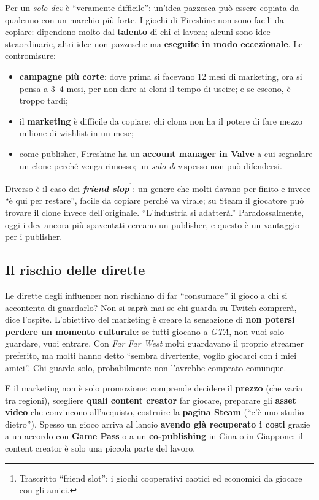 Per un \emph{solo dev} è ``veramente difficile'': un'idea pazzesca può essere
copiata da qualcuno con un marchio più forte. I giochi di Fireshine non sono facili
da copiare: dipendono molto dal \textbf{talento} di chi ci lavora; alcuni sono idee
straordinarie, altri idee non pazzesche ma \textbf{eseguite in modo eccezionale}.
Le contromisure:
\begin{itemize}
  \item \textbf{campagne più corte}: dove prima si facevano 12 mesi di marketing,
        ora si pensa a 3--4 mesi, per non dare ai cloni il tempo di uscire; e se
        escono, è troppo tardi;
  \item il \textbf{marketing} è difficile da copiare: chi clona non ha il potere di
        fare mezzo milione di wishlist in un mese;
  \item come publisher, Fireshine ha un \textbf{account manager in Valve} a cui
        segnalare un clone perché venga rimosso; un \emph{solo dev} spesso non
        può difendersi.
\end{itemize}
Diverso è il caso dei \textbf{\emph{friend slop}}\footnote{Trascritto ``friend
slot'': i giochi cooperativi caotici ed economici da giocare con gli amici.}: un
genere che molti davano per finito e invece ``è qui per restare'', facile da
copiare perché va virale; su Steam il giocatore può trovare il clone invece
dell'originale. ``L'industria si adatterà.'' Paradossalmente, oggi i dev ancora più
spaventati cercano un publisher, e questo è un vantaggio per i publisher.

\subsection{Il rischio delle dirette}

Le dirette degli influencer non rischiano di far ``consumare'' il gioco a chi si
accontenta di guardarlo? Non si saprà mai se chi guarda su Twitch comprerà, dice
l'ospite. L'obiettivo del marketing è creare la sensazione di \textbf{non potersi
perdere un momento culturale}: se tutti giocano a \emph{GTA}, non vuoi solo
guardare, vuoi entrare. Con \emph{Far Far West} molti guardavano il proprio
streamer preferito, ma molti hanno detto ``sembra divertente, voglio giocarci con i
miei amici''. Chi guarda solo, probabilmente non l'avrebbe comprato comunque.

E il marketing non è solo promozione: comprende decidere il \textbf{prezzo} (che
varia tra regioni), scegliere \textbf{quali content creator} far giocare,
preparare gli \textbf{asset video} che convincono all'acquisto, costruire la
\textbf{pagina Steam} (``c'è uno studio dietro''). Spesso un gioco arriva al lancio
\textbf{avendo già recuperato i costi} grazie a un accordo con \textbf{Game Pass} o
a un \textbf{co-publishing} in Cina o in Giappone: il content creator è solo una
piccola parte del lavoro.

